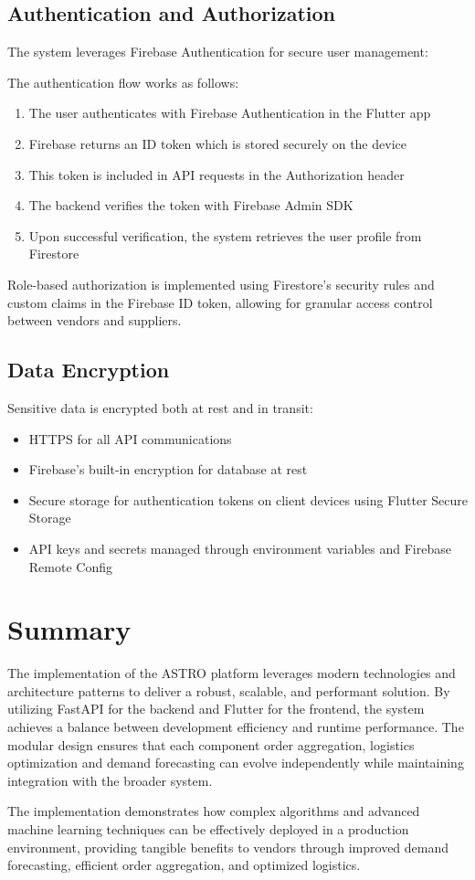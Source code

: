 \subsection{Authentication and Authorization}

The system leverages Firebase Authentication for secure user management:

The authentication flow works as follows:

\begin{enumerate}
    \item The user authenticates with Firebase Authentication in the Flutter app
    \item Firebase returns an ID token which is stored securely on the device
    \item This token is included in API requests in the Authorization header
    \item The backend verifies the token with Firebase Admin SDK
    \item Upon successful verification, the system retrieves the user profile from Firestore
\end{enumerate}

Role-based authorization is implemented using Firestore's security rules and custom claims in the Firebase ID token, allowing for granular access control between vendors and suppliers.

\subsection{Data Encryption}

Sensitive data is encrypted both at rest and in transit:

\begin{itemize}
    \item HTTPS for all API communications
    \item Firebase's built-in encryption for database at rest
    \item Secure storage for authentication tokens on client devices using Flutter Secure Storage
    \item API keys and secrets managed through environment variables and Firebase Remote Config
\end{itemize}

\section{Summary}

The implementation of the ASTRO platform leverages modern technologies and architecture patterns to deliver a robust, scalable, and performant solution. By utilizing FastAPI for the backend and Flutter for the frontend, the system achieves a balance between development efficiency and runtime performance. The modular design ensures that each component order aggregation, logistics optimization and demand forecasting can evolve independently while maintaining integration with the broader system.

The implementation demonstrates how complex algorithms and advanced machine learning techniques can be effectively deployed in a production environment, providing tangible benefits to vendors through improved demand forecasting, efficient order aggregation, and optimized logistics.